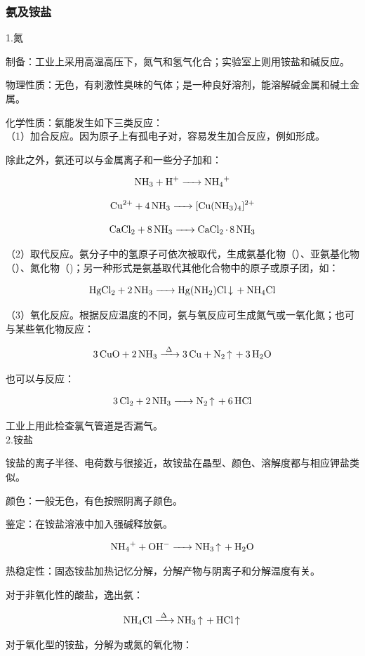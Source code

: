 \documentclass[a4paper,UTF8]{article}
\begin{document}
\subsubsection{氨及铵盐}

1.氮

制备：工业上采用高温高压下，氮气和氢气化合；实验室上则用铵盐和碱反应。

物理性质：无色，有刺激性臭味的气体；是一种良好溶剂，能溶解碱金属和碱土金属。

化学性质：氨能发生如下三类反应：\\

（1）加合反应。因为原子上有孤电子对，容易发生加合反应，例如形成。

除此之外，氨还可以与金属离子和一些分子加和：

$$ \ce{NH3 + H+ -> NH4+} $$

$$ \ce{Cu^2+ + 4NH3 -> [Cu(NH3)4]^2+} $$

$$ \ce{CaCl2 + 8NH3 -> CaCl2 * 8NH3} $$

（2）取代反应。氨分子中的氢原子可依次被取代，生成氨基化物（）、亚氨基化物（）、氮化物（)；另一种形式是氨基取代其他化合物中的原子或原子团，如：

$$ \ce{HgCl2 + 2NH3 -> Hg(NH2)Cl v + NH4Cl} $$

（3）氧化反应。根据反应温度的不同，氨与氧反应可生成氮气或一氧化氮；也可与某些氧化物反应：

$$ \ce{3CuO + 2NH3 ->[\Delta] 3Cu + N2 ^ + 3H2O} $$

也可以与反应：

$$ \ce{3Cl2 + 2NH3 -> N2 ^ + 6HCl} $$

工业上用此检查氯气管道是否漏气。\\

2.铵盐

铵盐的离子半径、电荷数与很接近，故铵盐在晶型、颜色、溶解度都与相应钾盐类似。

颜色：一般无色，有色按照阴离子颜色。

鉴定：在铵盐溶液中加入强碱释放氨。

$$ \ce{NH4+ + OH- -> NH3 ^ + H2O} $$

热稳定性：固态铵盐加热记忆分解，分解产物与阴离子和分解温度有关。

对于非氧化性的酸盐，逸出氨：

$$ \ce{NH4Cl ->[\Delta] NH3 ^ + HCl ^ } $$

对于氧化型的铵盐，分解为或氮的氧化物：
\end{document}
